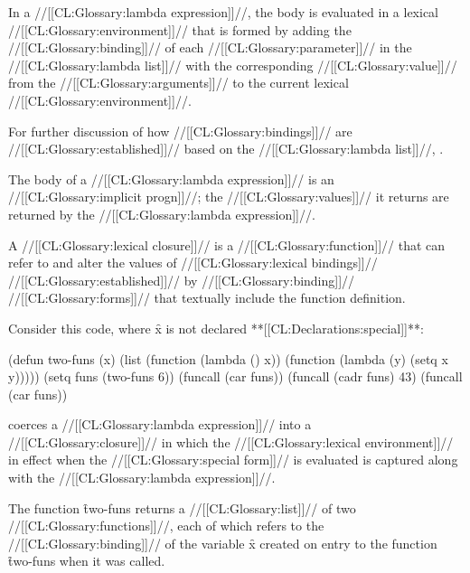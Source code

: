 \endSubsection%












In a //[[CL:Glossary:lambda expression]]//,
the body is evaluated in a lexical //[[CL:Glossary:environment]]// that is formed by
adding the //[[CL:Glossary:binding]]// of 
each //[[CL:Glossary:parameter]]// in the //[[CL:Glossary:lambda list]]//
with the corresponding //[[CL:Glossary:value]]// from the //[[CL:Glossary:arguments]]//
to the current lexical //[[CL:Glossary:environment]]//.

For further discussion of how //[[CL:Glossary:bindings]]// are //[[CL:Glossary:established]]// 
based on the //[[CL:Glossary:lambda list]]//, \seesection\LambdaLists.

The body of a //[[CL:Glossary:lambda expression]]// is an //[[CL:Glossary:implicit progn]]//;
the //[[CL:Glossary:values]]// it returns are returned by the //[[CL:Glossary:lambda expression]]//.






\endsubsection%

 

A //[[CL:Glossary:lexical closure]]// is a //[[CL:Glossary:function]]// that can refer to and alter
the values of //[[CL:Glossary:lexical bindings]]// //[[CL:Glossary:established]]// by //[[CL:Glossary:binding]]// //[[CL:Glossary:forms]]//
that textually include the function definition.
 
Consider this code, where \f{x} is not declared **[[CL:Declarations:special]]**:
 
\code
 (defun two-funs (x)
   (list (function (lambda () x))
         (function (lambda (y) (setq x y)))))
 (setq funs (two-funs 6))
 (funcall (car funs)) 
 (funcall (cadr funs) 43) 
 (funcall (car funs)) 
\endcode

 coerces a 
//[[CL:Glossary:lambda expression]]// into a //[[CL:Glossary:closure]]// in which the 
//[[CL:Glossary:lexical environment]]// in effect when the //[[CL:Glossary:special form]]// is
evaluated is captured along with the //[[CL:Glossary:lambda expression]]//.

The function \f{two-funs} returns a //[[CL:Glossary:list]]// of two 
//[[CL:Glossary:functions]]//, each of which refers to the //[[CL:Glossary:binding]]// of the
variable \f{x} created on entry to the function \f{two-funs} when it
was called.


